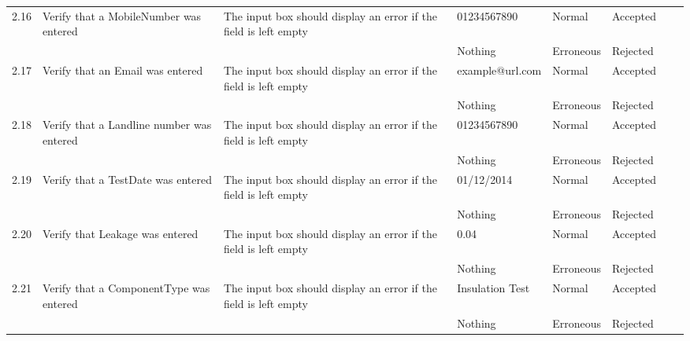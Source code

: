 \begin{landscape}
\begin{center}
\begin{longtable}{|p{1.5cm}|p{2cm}|p{3cm}|p{2cm}|p{2cm}|p{2.5cm}|p{2cm}|p{2cm}|}
        2.16 & Verify that a MobileNumber was entered & The input box should display an error if the field is left empty & 01234567890 & Normal & Accepted & & \\   
             &                                      &                                                               & Nothing      & Erroneous & Rejected & & \\ \hline
             
        2.17 & Verify that an Email was entered & The input box should display an error if the field is left empty & example@url.com & Normal & Accepted & & \\   
             &                                      &                                                               & Nothing      & Erroneous & Rejected & & \\ \hline
             
        2.18 & Verify that a Landline number was entered & The input box should display an error if the field is left empty & 01234567890 & Normal & Accepted & & \\   
             &                                      &                                                               & Nothing      & Erroneous & Rejected & & \\ \hline
             
        2.19 & Verify that a TestDate  was entered & The input box should display an error if the field is left empty & 01/12/2014 & Normal & Accepted & & \\   
             &                                      &                                                               & Nothing      & Erroneous & Rejected & & \\ \hline
             
        2.20 & Verify that Leakage was entered & The input box should display an error if the field is left empty & 0.04 & Normal & Accepted & & \\   
             &                                      &                                                               & Nothing      & Erroneous & Rejected & & \\ \hline
             
        2.21 & Verify that a ComponentType was entered & The input box should display an error if the field is left empty & Insulation Test & Normal & Accepted & & \\   
             &                                      &                                                               & Nothing      & Erroneous & Rejected & & \\ \hline
             

\end{longtable}
\end{center}
\end{landscape}
